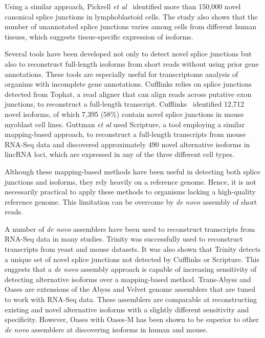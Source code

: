 \documentclass[10pt]{article}
\begin{document}
Using a similar approach, Pickrell {\em et al}~\cite{Pickrell:2010gt}
identified more than 150,000 novel canonical splice junctions in lymphoblastoid
cells.  The study also shows that the number of unannotated splice junctions
varies among cells from different human tissues, which suggests tissue-specific
expression of isoforms\cite{Pickrell:2010gt}.

Several tools have been developed not only to detect novel splice
junctions but also to reconstruct full-length isoforms from short
reads without using prior gene annotations.  These tools are especially
useful for transcriptome analysis of organims with incomplete gene
annotations.  Cufflinks\cite{Trapnell:2010kd} relies on splice
junctions detected from Tophat\cite{Trapnell:2009dp}, a read aligner
that can align reads across putative exon junctions, to reconstruct a
full-length transcript.  Cufflinks~\cite{} identified 12,712 novel isoforms,
of which 7,395 ($58\%$) contain novel splice junctions in mouse
myoblast cell lines.  Guttman {\em et al} used Scripture, a tool
employing a similar mapping-based approach, to reconstruct a full-length
transcripts from mouse RNA-Seq data and discovered approximately 490
novel alternative isoforms in lincRNA loci, which are expressed in any
of the three different cell types\cite{Guttman:2010io}.

Although these mapping-based methods have been useful in detecting
both splice junctions and isoforms, they rely heavily on a reference
genome.  Hence, it is not necessarily practical to apply these methods
to organisms lacking a high-quality reference genome.  This limitation
can be overcome by {\em de novo} assembly of short reads.

A number of {\em de novo} assemblers have been used to reconstruct
transcripts from RNA-Seq data in many studies.
Trinity\cite{Grabherr:2011jb} was successfully used to reconstruct
transcripts from yeast and mouse datasets.  It was also shown that
Trinity detects a unique set of novel splice junctions not detected by
Cufflinks or Scripture.  This suggests that a {\em de novo} assembly
approach is capable of increasing sensitivity of detecting
alternative isoforms over a mapping-based method.
Trans-Abyss\cite{Robertson:2010ih} and Oases\cite{Schulz:2012je} are
extensions of the Abyss\cite{Simpson:2009iv} and
Velvet\cite{Zerbino:2008vu,Zerbino:2009jp} genome assemblers that are
tuned to work with RNA-Seq data.  These assemblers are comparable at
reconstructing existing and novel alternative isoforms with a slightly
different sensitivity and specificity.  However, Oases with Oases-M
has been shown to be superior to other {\em de novo} assemblers at
discovering isoforms in human and mouse\cite{Schulz:2012je}.
\end{document}
